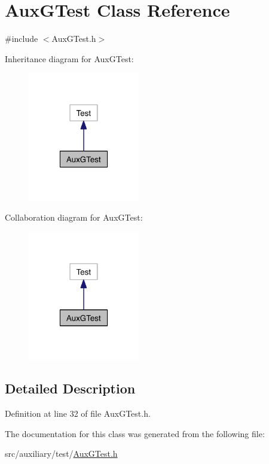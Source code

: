 \hypertarget{class_aux_g_test}{\section{Aux\-G\-Test Class Reference}
\label{class_aux_g_test}
}


{\ttfamily \#include $<$Aux\-G\-Test.\-h$>$}



Inheritance diagram for Aux\-G\-Test\-:\nopagebreak
\begin{figure}[H]
\begin{center}
\leavevmode
\includegraphics[width=138pt]{class_aux_g_test__inherit__graph}
\end{center}
\end{figure}


Collaboration diagram for Aux\-G\-Test\-:\nopagebreak
\begin{figure}[H]
\begin{center}
\leavevmode
\includegraphics[width=138pt]{class_aux_g_test__coll__graph}
\end{center}
\end{figure}


\subsection{Detailed Description}


Definition at line 32 of file Aux\-G\-Test.\-h.



The documentation for this class was generated from the following file\-:\begin{DoxyCompactItemize}
\item 
src/auxiliary/test/\hyperlink{_aux_g_test_8h}{Aux\-G\-Test.\-h}\end{DoxyCompactItemize}
